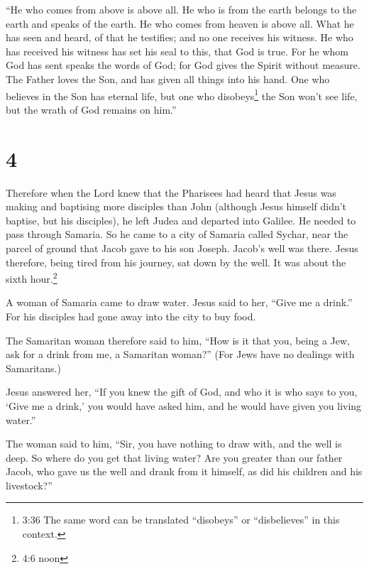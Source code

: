  ``He who comes from above is above all. He who is from the
earth belongs to the earth and speaks of the earth. He who comes from
heaven is above all.  What he has seen and heard, of that
he testifies; and no one receives his witness.  He who has
received his witness has set his seal to this, that God is true.
 For he whom God has sent speaks the words of God; for God
gives the Spirit without measure.  The Father loves the
Son, and has given all things into his hand.  One who
believes in the Son has eternal life, but one who disobeys\footnote{3:36
  The same word can be translated ``disobeys'' or ``disbelieves'' in
  this context.} the Son won't see life, but the wrath of God remains on
him.''

\hypertarget{section-3}{%
\section{4}\label{section-3}}

 Therefore when the Lord knew that the Pharisees had heard
that Jesus was making and baptising more disciples than John
 (although Jesus himself didn't baptise, but his disciples),
 he left Judea and departed into Galilee.  He
needed to pass through Samaria.  So he came to a city of
Samaria called Sychar, near the parcel of ground that Jacob gave to his
son Joseph.  Jacob's well was there. Jesus therefore, being
tired from his journey, sat down by the well. It was about the sixth
hour.\footnote{4:6 noon}

 A woman of Samaria came to draw water. Jesus said to her,
``Give me a drink.''  For his disciples had gone away into
the city to buy food.

 The Samaritan woman therefore said to him, ``How is it that
you, being a Jew, ask for a drink from me, a Samaritan woman?'' (For
Jews have no dealings with Samaritans.)

 Jesus answered her, ``If you knew the gift of God, and who
it is who says to you, `Give me a drink,' you would have asked him, and
he would have given you living water.''

 The woman said to him, ``Sir, you have nothing to draw
with, and the well is deep. So where do you get that living water?
 Are you greater than our father Jacob, who gave us the
well and drank from it himself, as did his children and his livestock?''

